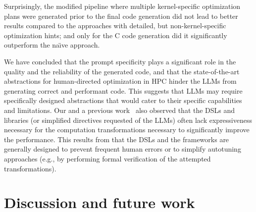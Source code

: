 Surprisingly, the modified pipeline where multiple kernel-specific optimization plans were generated prior to the final code generation did not lead to better results compared to the approaches with detailed, but non-kernel-specific optimization hints; and only for the C code generation did it significantly outperform the na\"{\i}ve approach.

We have concluded that the prompt specificity plays a significant role in the quality and the reliability of the generated code, and that the state-of-the-art abstractions for human-directed optimization in HPC hinder the LLMs from generating correct and performant code. This suggests that LLMs may require specifically designed abstractions that would cater to their specific capabilities and limitations. Our and a previous work~\cite{merouani2025agentic} also observed that the DSLs and libraries (or simplified
directives requested of the LLMs) often lack expressiveness necessary for the computation transformations necessary to significantly improve the performance. This results from that the DSLs and the frameworks are generally designed to prevent frequent human errors or to simplify autotuning approaches (e.g., by performing formal verification of the attempted transformations).


\section{Discussion and future work}\label{sec:llm-directed-optimization-discussion}

